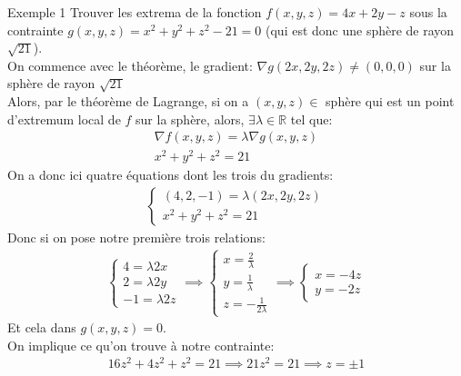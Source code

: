 \begin{parag}{Exemple 1}
    Trouver les extrema de la fonction $f\left(x, y, z\right) = 4x + 2y - z$ sous la contrainte $g\left(x, y, z\right) = x^2 + y^2 + z^2 - 21 = 0$ (qui est donc une sphère de rayon $\sqrt{21}$).\\
    On commence avec le théorème, le gradient: $\nabla g\left(2x, 2y, 2z\right) \neq \left(0, 0, 0\right)$ sur la sphère de rayon $\sqrt{21}$\\
    Alors, par le théorème de Lagrange, si on a $\left(x, y, z\right) \in $ sphère qui est un point d'extremum local de $f$ sur la sphère, alors, $\exists \lambda \in \mathbb{R}$ tel que:
    \begin{align*} 
        \nabla f\left(x, y, z\right) = \lambda \nabla g\left(x, y, z\right)\\
        x^2 + y^2 + z^2 =  21
    \end{align*}
    On a donc ici quatre équations dont les trois du gradients:
    \begin{align*}
        \begin{cases}
            \left(4, 2, -1\right) =  \lambda \left(2x, 2y, 2z\right)\\
            x^2 + y^2 + z^2 =  21
        \end{cases}
    \end{align*}
    Donc si on pose notre première trois relations:
    \begin{align*}
        \begin{cases}
            4 =  \lambda 2x\\
            2 =  \lambda 2y \\
            -1 =  \lambda 2z
            \end{cases} \implies \begin{cases}
            x =  \frac{2}{\lambda}\\
            y =  \frac{1}{\lambda}\\
            z =  - \frac{1}{2\lambda}
        \end{cases}
        \implies \begin{cases} x =  -4z \\ y =  -2z \end{cases}
    \end{align*}
    Et cela dans $g\left(x, y, z\right) =  0$.\\
    On implique ce qu'on trouve à notre contrainte:
    \begin{align*} 16z^2 + 4z^2 + z^2 =  21 \implies 21z^2 =  21 \implies z = \pm 1 \end{align*}

\end{parag}
